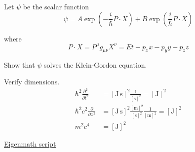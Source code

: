 Let $\psi$ be the scalar function
\begin{equation*}
\psi=A\exp\left(-\frac{i}{\hbar}P\cdot X\right)
+B\exp\left(\frac{i}{\hbar}P\cdot X\right)
\end{equation*}

where
\begin{equation*}
P\cdot X=P^\mu g_{\mu\nu}X^\nu=Et-p_xx-p_yy-p_zz
\end{equation*}

Show that $\psi$ solves the Klein-Gordon equation.

\bigskip
Verify dimensions.
\begin{align*}
\hbar^2\frac{\partial^2}{\partial t^2}&=[\text{J}\,\text{s}]^2
\frac{1}{[\text{s}]^2}=[\text{J}]^2
\\[1ex]
\hbar^2c^2\frac{\partial}{\partial x^2}
&=[\text{J}\,\text{s}]^2\frac{[\text{m}]^2}{[\text{s}]^2}\frac{1}{[\text{m}]^2}=[\text{J}]^2
\\[1ex]
m^2c^4&=[\text{J}]^2
\end{align*}

\href{https://georgeweigt.github.io/examples/klein-gordon-equation-demo.html}{Eigenmath script}



